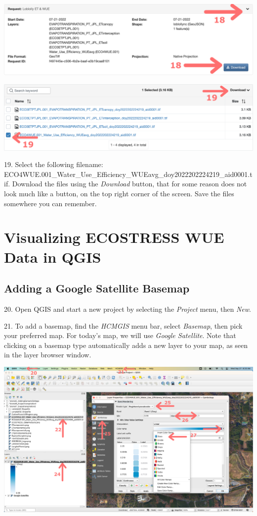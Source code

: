 \documentclass[oneside,a4paper,11pt,explicit]{book}
\begin{document}
\vspace{.5em}

\centerline{\includegraphics[width=.6\textwidth]{RequestDownload.png}}

\vspace{.5em}

\vspace{.5em}

\centerline{\includegraphics[width=.6\textwidth]{WUEDownload.png}}

\vspace{.5em}

19. Select the following filename: ECO4WUE.001\_Water\_Use\_Efficiency\_WUEavg\_doy2022202224219\_aid0001.tif. Download the files using the \textit{Download} button, that for some reason does not look much like a button, on the top right corner of the screen. Save the files somewhere you can remember. 

\section{Visualizing ECOSTRESS WUE Data in QGIS}

\subsection{Adding a Google Satellite Basemap}

20. Open QGIS and start a new project by selecting the \textit{Project} menu, then \textit{New}.

21. To add a basemap, find the \textit{HCMGIS} menu bar, select \textit{Basemap}, then pick your preferred map. For today's map, we will use \textit{Google Satellite}. Note that clicking on a basemap type automatically adds a new layer to your map, as seen in the layer browser window.

\vspace{.5em}

\centerline{\includegraphics[width=\textwidth]{WUELayer.png}}
\end{document}
